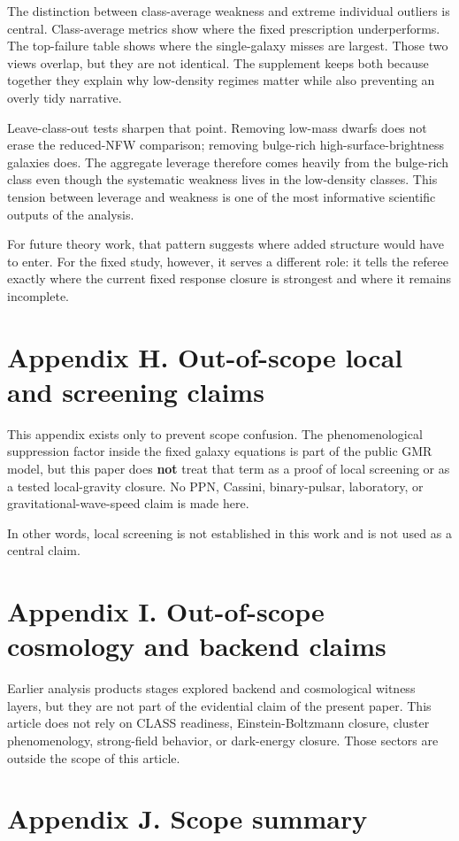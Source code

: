 \documentclass[twocolumn,linenumbers]{aastex701}
\begin{document}
The distinction between class-average weakness and extreme individual outliers is central. Class-average metrics show where the fixed prescription underperforms. The top-failure table shows where the single-galaxy misses are largest. Those two views overlap, but they are not identical. The supplement keeps both because together they explain why low-density regimes matter while also preventing an overly tidy narrative.

Leave-class-out tests sharpen that point. Removing low-mass dwarfs does not erase the reduced-NFW comparison; removing bulge-rich high-surface-brightness galaxies does. The aggregate leverage therefore comes heavily from the bulge-rich class even though the systematic weakness lives in the low-density classes. This tension between leverage and weakness is one of the most informative scientific outputs of the analysis.

For future theory work, that pattern suggests where added structure would have to enter. For the fixed study, however, it serves a different role: it tells the referee exactly where the current fixed response closure is strongest and where it remains incomplete.
\section{Appendix H. Out-of-scope local and screening claims}

This appendix exists only to prevent scope confusion. The phenomenological suppression factor inside the fixed galaxy equations is part of the public GMR model, but this paper does \textbf{not} treat that term as a proof of local screening or as a tested local-gravity closure. No PPN, Cassini, binary-pulsar, laboratory, or gravitational-wave-speed claim is made here.

In other words, local screening is not established in this work and is not used as a central claim.
\section{Appendix I. Out-of-scope cosmology and backend claims}

Earlier analysis products stages explored backend and cosmological witness layers, but they are not part of the evidential claim of the present paper. This article does not rely on CLASS readiness, Einstein-Boltzmann closure, cluster phenomenology, strong-field behavior, or dark-energy closure. Those sectors are outside the scope of this article.
\section{Appendix J. Scope summary}
\end{document}
